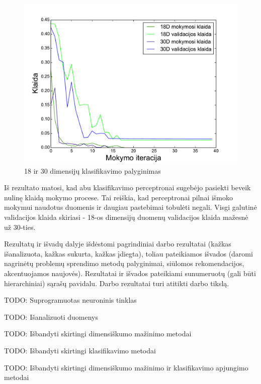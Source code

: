 \documentclass{VUMIFPSbakalaurinis}
\newcommand{\TODO}[1]{
\colorbox{todo-background-color}{TODO: #1}
}
\begin{document}
\begin{figure}
	\includegraphics[scale=0.75]{pics/dim_comparisons_2015-5-27_14-21-13}
	\caption{18 ir 30 dimensijų klasifikavimo palyginimas}
	\label{fig:dim-comparisons}
\end{figure}

Iš rezultato matosi, kad abu klasifikavimo perceptronai sugebėjo pasiekti beveik nulinę klaidą mokymo procese.
Tai reiškia, kad perceptronai pilnai išmoko mokymui naudotus duomenis ir daugiau pastebimai tobulėti negali.
Visgi galutinė validacijos klaida skiriasi - 18-os dimensijų duomenų validacijos klaida mažesnė už 30-ties.


Rezultatų ir išvadų dalyje išdėstomi pagrindiniai darbo rezultatai (kažkas
išanalizuota, kažkas sukurta, kažkas įdiegta), toliau pateikiamos išvados
(daromi nagrinėtų problemų sprendimo metodų palyginimai, siūlomos
rekomendacijos, akcentuojamos naujovės). Rezultatai ir išvados pateikiami
sunumeruotų (gali būti hierarchiniai) sąrašų pavidalu. Darbo rezultatai turi
atitikti darbo tikslą.

\TODO{Suprogramuotas neuroninis tinklas}
\TODO{Išanalizuoti duomenys}
\TODO{Išbandyti skirtingi dimensiškumo mažinimo metodai}
\TODO{Išbandyti skirtingi klasifikavimo metodai}
\TODO{Išbandyti skirtingi dimensiškumo mažinimo ir klasifikavimo apjungimo metodai}


\printbibliography[heading=bibintoc]  %

\end{document}

